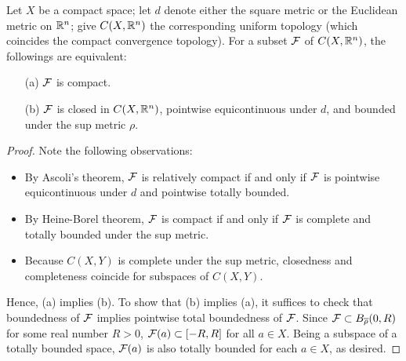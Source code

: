 \begin{cor}
    Let $X$ be a compact space; let $d$ denote either the square metric or the Euclidean metric on ${\mathbb{R}}^n$; give $C(X, {\mathbb{R}}^n)$ the corresponding uniform topology (which coincides the compact convergence topology).
    For a subset ${\mathcal{F}}$ of $C(X, {\mathbb{R}}^n)$, the followings are equivalent:
    \begin{enumerate}
        \item[(a)]
        {
            ${\mathcal{F}}$ is compact.
        }
        \item[(b)]
        {
            ${\mathcal{F}}$ is closed in $C(X, {\mathbb{R}}^n)$, pointwise equicontinuous under $d$, and bounded under the sup metric $\rho$.
        }
    \end{enumerate}
\end{cor}
\begin{proof}
    Note the following observations:
    \begin{itemize}
        \item
        {
            By Ascoli's theorem, ${\mathcal{F}}$ is relatively compact if and only if ${\mathcal{F}}$ is pointwise equicontinuous under $d$ and pointwise totally bounded.
        }
        \item
        {
            By Heine-Borel theorem, ${\mathcal{F}}$ is compact if and only if ${\mathcal{F}}$ is complete and totally bounded under the sup metric.
        }
        \item
        {
            Because $C(X, Y)$ is complete under the sup metric, closedness and completeness coincide for subspaces of $C(X, Y)$.
        }
    \end{itemize}
    Hence, (a) implies (b).
    To show that (b) implies (a), it suffices to check that boundedness of ${\mathcal{F}}$ implies pointwise total boundedness of ${\mathcal{F}}$.
    Since ${\mathcal{F}}\subset B_{\overline{\rho}}(0, R)$ for some real number $R>0$, ${\mathcal{F}}(a)\subset[-R, R]$ for all $a\in X$.
    Being a subspace of a totally bounded space, ${\mathcal{F}}(a)$ is also totally bounded for each $a\in X$, as desired.
\end{proof}

